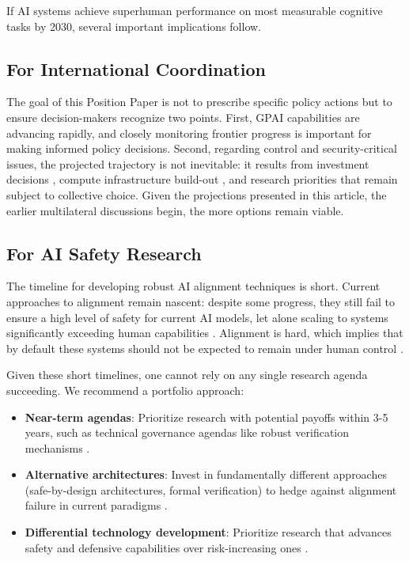 \documentclass[letterpaper,twocolumn]{article}
\begin{document}
If AI systems achieve superhuman performance on most measurable cognitive tasks by 2030, several important implications follow.

\subsection{For International Coordination}
\label{subsec:governance}

The goal of this Position Paper is not to prescribe specific policy actions but to ensure decision-makers recognize two points. First, GPAI capabilities are advancing rapidly, and closely monitoring frontier progress is important for making informed policy decisions. Second, regarding control and security-critical issues, the projected trajectory is not inevitable: it results from investment decisions \citep{sevilla_can_2024}, compute infrastructure build-out \citep{epoch_ai_data_2025}, and research priorities \citep{erdil_algorithmic_2023} that remain subject to collective choice. Given the projections presented in this article, the earlier multilateral discussions begin, the more options remain viable.


\subsection{For AI Safety Research}
\label{subsec:safety}

The timeline for developing robust AI alignment techniques is short.
Current approaches to alignment remain nascent: despite some progress, they still fail to ensure a high level of safety for current AI models, let alone scaling to systems significantly exceeding human capabilities \citep{amodei_concrete_2016, bengio_international_2025}. Alignment is hard, which implies that by default these systems should not be expected to remain under human control \citep{maier_take_2025, ngo_alignment_2025}.

Given these short timelines, one cannot rely on any single research agenda succeeding. We recommend a portfolio approach:
\begin{itemize}
    \item \textbf{Near-term agendas}: Prioritize research with potential payoffs within 3-5 years, such as technical governance agendas like robust verification mechanisms \citep{wasil_governing_2024, scher_mechanisms_2024}.
    \item \textbf{Alternative architectures}: Invest in fundamentally different approaches (safe-by-design architectures, formal verification) to hedge against alignment failure in current paradigms \citep{dalrymple_towards_2024}.
    \item \textbf{Differential technology development}: Prioritize research that advances safety and defensive capabilities over risk-increasing ones \citep{sandbrink_differential_2022}.
\end{itemize}
\end{document}
